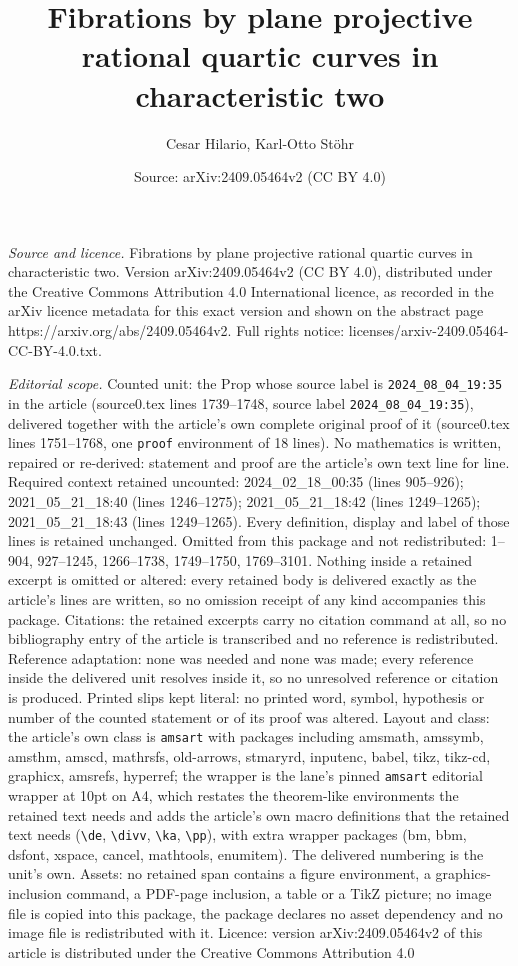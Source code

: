 \documentclass[10pt,a4paper]{amsart}
\title[Fibrations by plane projective rational quartic curves in ch]{Fibrations by plane projective rational quartic curves in characteristic two}
\author{Cesar Hilario, Karl-Otto St\"ohr}
\date{Source: arXiv:2409.05464v2 (CC BY 4.0)}
\begin{document}
\maketitle

\noindent\emph{Source and licence.} Fibrations by plane projective rational quartic curves in characteristic two. Version arXiv:2409.05464v2 (CC BY 4.0), distributed under the Creative Commons Attribution 4.0 International licence, as recorded in the arXiv licence metadata for this exact version and shown on the abstract page https://arxiv.org/abs/2409.05464v2. Full rights notice: licenses/arxiv-2409.05464-CC-BY-4.0.txt.\par\smallskip

\noindent\textit{Editorial scope.} Counted unit: the Prop whose source label is \texttt{2024\_08\_04\_19:35} in the article (source0.tex lines 1739--1748, source label \texttt{2024\_08\_04\_19:35}), delivered together with the article's own complete original proof of it (source0.tex lines 1751--1768, one \texttt{proof} environment of 18 lines). No mathematics is written, repaired or re-derived: statement and proof are the article's own text line for line. Required context retained uncounted: 2024\_02\_18\_00:35 (lines 905--926); 2021\_05\_21\_18:40 (lines 1246--1275); 2021\_05\_21\_18:42 (lines 1249--1265); 2021\_05\_21\_18:43 (lines 1249--1265). Every definition, display and label of those lines is retained unchanged. Omitted from this package and not redistributed: 1--904, 927--1245, 1266--1738, 1749--1750, 1769--3101. Nothing inside a retained excerpt is omitted or altered: every retained body is delivered exactly as the article's lines are written, so no omission receipt of any kind accompanies this package. Citations: the retained excerpts carry no citation command at all, so no bibliography entry of the article is transcribed and no reference is redistributed. Reference adaptation: none was needed and none was made; every reference inside the delivered unit resolves inside it, so no unresolved reference or citation is produced. Printed slips kept literal: no printed word, symbol, hypothesis or number of the counted statement or of its proof was altered. Layout and class: the article's own class is \texttt{amsart} with packages including amsmath, amssymb, amsthm, amscd, mathrsfs, old-arrows, stmaryrd, inputenc, babel, tikz, tikz-cd, graphicx, amsrefs, hyperref; the wrapper is the lane's pinned \texttt{amsart} editorial wrapper at 10pt on A4, which restates the theorem-like environments the retained text needs and adds the article's own macro definitions that the retained text needs (\texttt{\textbackslash de}, \texttt{\textbackslash divv}, \texttt{\textbackslash ka}, \texttt{\textbackslash pp}), with extra wrapper packages (bm, bbm, dsfont, xspace, cancel, mathtools, enumitem). The delivered numbering is the unit's own. Assets: no retained span contains a figure environment, a graphics-inclusion command, a PDF-page inclusion, a table or a TikZ picture; no image file is copied into this package, the package declares no asset dependency and no image file is redistributed with it. Licence: version arXiv:2409.05464v2 of this article is distributed under the Creative Commons Attribution 4.0 
\end{document}
